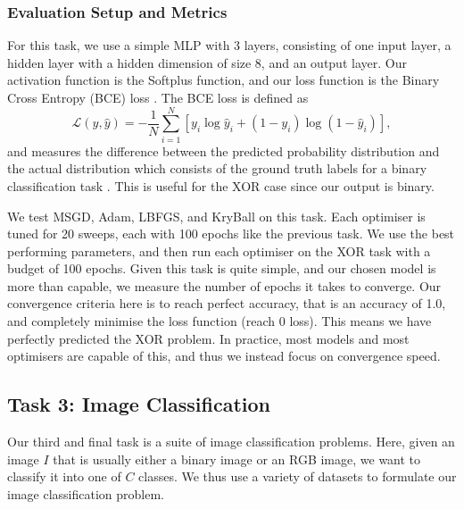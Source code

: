 \subsubsection{Evaluation Setup and Metrics}
\label{sssec:task_2_evaluation_setup_and_metrics}
For this task, we use a simple MLP with 3 layers, consisting of one input layer, a hidden layer with a hidden dimension of size 8, and an output layer. Our activation function is the Softplus function, and our loss function is the Binary Cross Entropy (BCE) loss \citep{mao2023cross}. The BCE loss is defined as
\begin{equation}
\mathcal{L}(y, \hat{y}) = -\frac{1}{N} \sum_{i=1}^N \left[ y_i \log \hat{y}_i + (1 - y_i) \log (1 - \hat{y}_i) \right],
\end{equation}
and measures the difference between the predicted probability distribution and the actual distribution which consists of the ground truth labels for a binary classification task \citep{mao2023cross}. This is useful for the XOR case since our output is binary.

We test MSGD, Adam, LBFGS, and KryBall on this task. Each optimiser is tuned for 20 sweeps, each with 100 epochs like the previous task. We use the best performing parameters, and then run each optimiser on the XOR task with a budget of 100 epochs. Given this task is quite simple, and our chosen model is more than capable, we measure the number of epochs it takes to converge. Our convergence criteria here is to reach perfect accuracy, that is an accuracy of 1.0, and completely minimise the loss function (reach 0 loss). This means we have perfectly predicted the XOR problem. In practice, most models and most optimisers are capable of this, and thus we instead focus on convergence speed. 

\subsection{Task 3: Image Classification}
\label{ssec:task_3_image_classification}

Our third and final task is a suite of image classification problems. Here, given an image $I$ that is usually either a binary image or an RGB image, we want to classify it into one of $C$ classes. We thus use a variety of datasets to formulate our image classification problem.

